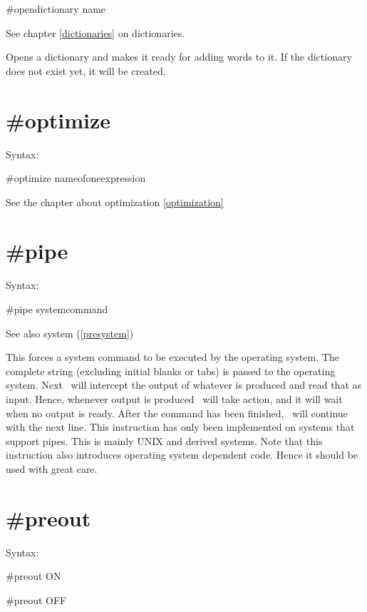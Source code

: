 \#opendictionary name
 
\noindent See chapter \ref{dictionaries} on dictionaries.

\noindent Opens a dictionary and makes it ready for adding words to it. If 
the dictionary does not exist yet, it will be created.


\section{\#optimize}
\label{preoptimize}

\noindent Syntax:

\#optimize nameofoneexpression

See the chapter about optimization \ref{optimization}
 
 
\section{\#pipe}
\label{prepipe}

\noindent Syntax:

\#pipe systemcommand
 
\noindent See also system (\ref{presystem})

\noindent This forces a system command to be executed by the 
operating system. The complete string (excluding initial blanks or tabs) is 
passed to the operating system. Next \FORM\ will intercept the output of 
whatever is produced and read that as input. Hence, whenever output is 
produced \FORM\ will take action, and it will wait when no output is ready. 
After the command has been finished, \FORM\ will continue with the next line. 
This instruction has only been implemented on systems that support 
pipes. This is mainly UNIX and derived systems. 
Note that this instruction also introduces operating system dependent code. 
Hence it should be used with great care.

 
\section{\#preout}
\label{prepreout}

\noindent Syntax:

\#preout ON

\#preout OFF

